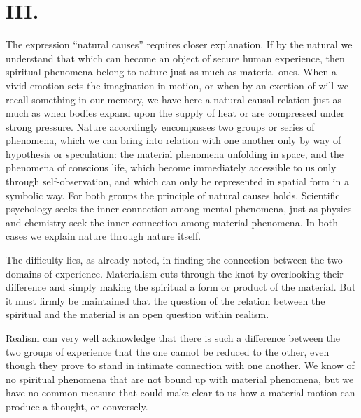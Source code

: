 \documentclass[12pt,a4paper]{article}
\begin{document}
\section*{III.}

The expression ``natural causes'' requires closer explanation. If by the
natural we understand that which can become an object of secure human
experience, then spiritual phenomena belong to nature just as much as
material ones. When a vivid emotion sets the imagination in motion, or
when by an exertion of will we recall something in our memory, we have
here a natural causal relation just as much as when bodies expand upon
the supply of heat or are compressed under strong pressure. Nature
accordingly encompasses two groups or series of phenomena, which we can
bring into relation with one another only by way of hypothesis or
speculation: the material phenomena unfolding in space, and the phenomena
of conscious life, which become immediately accessible to us only through
self-observation, and which can only be represented in spatial form in a
symbolic way. For both groups the principle of natural causes holds.
Scientific psychology seeks the inner connection among mental phenomena,
just as physics and chemistry seek the inner connection among material
phenomena. In both cases we explain nature through nature itself.

The difficulty lies, as already noted, in finding the connection between
the two domains of experience. Materialism cuts through the knot by
overlooking their difference and simply making the spiritual a form or
product of the material. But it must firmly be maintained that the
question of the relation between the spiritual and the material is an open
question within realism.

Realism can very well acknowledge that there is such a difference between
the two groups of experience that the one cannot be reduced to the other,
even though they prove to stand in intimate connection with one another.
We know of no spiritual phenomena that are not bound up with material
phenomena, but we have no common measure that could make clear to us how
a material motion can produce a thought, or conversely.
\end{document}
